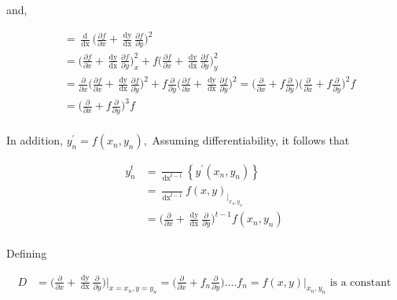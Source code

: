 \documentclass[12 pt]{article}
\begin{document}
and,

\begin{equation*}
	\begin{split}
		\frac{\mathop{\mathrm{d^{3}f}}}{\mathop{\mathrm{dx^{3}}}} &= \frac{\mathop{\mathrm{d}}}{\mathop{\mathrm{dx}}}\bigg(\frac{\partial f}{\partial x} + \frac{\mathop{\mathrm{dy}}}{\mathop{\mathrm{dx}}}\frac{\partial f}{\partial y}\bigg)^{2}\\ 
		&=  \bigg(\frac{\partial f}{\partial x}+\frac{\mathop{\mathrm{dy}}}{\mathop{\mathrm{dx}}}\frac{\partial f}{\partial y}\bigg)^{2}_{x} +   f\bigg(\frac{\partial f}{\partial x}+\frac{\mathop{\mathrm{dy}}}{\mathop{\mathrm{dx}}}\frac{\partial f}{\partial y}\bigg)^{2}_{y}\\
		&= \frac{\partial }{\partial x}\bigg(\frac{\partial f}{\partial x}+\frac{\mathop{\mathrm{dy}}}{\mathop{\mathrm{dx}}}\frac{\partial f}{\partial y}\bigg)^{2}+f\frac{\partial }{\partial y}\bigg(\frac{\partial f}{\partial x}+\frac{\mathop{\mathrm{dy}}}{\mathop{\mathrm{dx}}}\frac{\partial f}{\partial y}\bigg)^{2}=\bigg(\frac{\partial }{\partial x}+f\frac{\partial }{\partial y}\bigg)\bigg(\frac{\partial }{\partial x}+f\frac{\partial }{\partial y}\bigg)^{2}f\\
		&= \bigg(\frac{\partial }{\partial x}+f\frac{\partial }{\partial y}\bigg)^{3}f\\
	\end{split}
\end{equation*}


In addition, $y_{n}^{\prime} = f(x_{n},y_{n}),$ Assuming differentiability, it follows that 

{
\Large
\begin{equation}\label{E4}
\begin{split}
y_{n}^{t} &= \frac{\mathop{\mathrm{d}^{t-1}}}{\mathop{\mathrm{dx}}^{t-1}} \left\{y^{\prime}(x_{n},y_{n})\right\}\\ 
		  &= \frac{\mathop{\mathrm{d}^{t-1}}}{\mathop{\mathrm{dx}}^{t-1}} f(x,y)_{|_{x_{n},y_{n}}}\\
		  &= \bigg(\frac{\partial}{\partial x} + \frac{\mathop{\mathrm{dy}}}{\mathop{\mathrm{dx}}}\frac{\partial}{\partial y}\bigg)^{t-1}f(x_{n},y_{n})\\
\end{split}
\end{equation}
}

Defining 

\begin{equation*}
\begin{split}
D &= \bigg(\frac{\partial }{\partial x} + {\frac{\mathop{\mathrm{dy}}}{\mathop{\mathrm{dx}}}}\frac{\partial }{\partial y}\bigg)\Big\vert_{x = x_{n}, y= y_{n}} = \bigg(\frac{\partial }{\partial x} + f_{n}\frac{\partial }{\partial y}\bigg)....f_{n} = f(x,y)\vert_{x_{n}, y_{n}}  \text{ is a constant}\\
\end{split}
\end{equation*}
\end{document}
